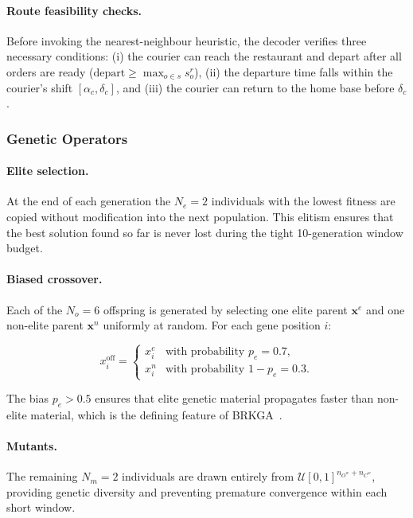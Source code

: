 \paragraph{Route feasibility checks.}
Before invoking the nearest-neighbour heuristic, the decoder
verifies three necessary conditions:
(i) the courier can reach the restaurant and depart
after all orders are ready ($\text{depart} \geq \max_{o \in s} s^r_o$),
(ii) the departure time falls within the courier's shift
$[\alpha_c, \delta_c]$, and
(iii) the courier can return to the home base before $\delta_c$.

\subsubsection{Genetic Operators}\label{subsubsec:operators}

\paragraph{Elite selection.}
At the end of each generation the $N_e = 2$ individuals with the
lowest fitness are copied without modification into the next
population.
This elitism ensures that the best solution found so far is never
lost during the tight 10-generation window budget.

\paragraph{Biased crossover.}
Each of the $N_o = 6$ offspring is generated by selecting one elite
parent $\mathbf{x}^e$ and one non-elite parent $\mathbf{x}^n$
uniformly at random.
For each gene position $i$:

\begin{equation}
    x^{\text{off}}_i =
    \begin{cases}
        x^e_i & \text{with probability } p_e = 0.7, \\
        x^n_i & \text{with probability } 1 - p_e = 0.3.
    \end{cases}
\end{equation}

\noindent
The bias $p_e > 0.5$ ensures that elite genetic material
propagates faster than non-elite material, which is the
defining feature of BRKGA~\cite{goncalves2011brkga}.

\paragraph{Mutants.}
The remaining $N_m = 2$ individuals are drawn entirely from
$\mathcal{U}[0,1]^{n_{O^w}+n_{C^w}}$, providing genetic diversity
and preventing premature convergence within each short window.


